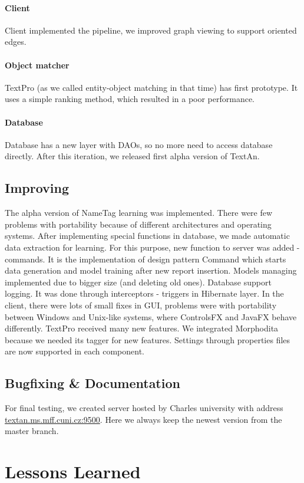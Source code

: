 \paragraph{Client} Client implemented the pipeline, we improved graph viewing to
support oriented edges.

\paragraph{Object matcher} TextPro (as we called entity-object matching in that
time) has first prototype. It uses a simple ranking method, which resulted in a
poor performance. 

\paragraph{Database} Database has a new layer with DAOs, so no more need to
access database directly. After this iteration, we released first alpha version
of TextAn.

\subsection{Improving}
The alpha version of NameTag learning was implemented. There were few problems
with portability because of different architectures and operating systems. After
implementing special functions in database, we made automatic data extraction
for learning. For this purpose, new function to server was added - commands. It
is the implementation of design pattern Command which starts data generation and
model training after new report insertion. Models managing implemented due to
bigger size (and deleting old ones). Database support logging. It was done
through interceptors - triggers in Hibernate layer. In the client, there were
lots of small fixes in GUI, problems were with portability between Windows and
Unix-like systems, where ControlsFX and JavaFX behave differently. TextPro
received many new features. We integrated Morphodita because we needed its
tagger for new features. Settings through properties files are now supported in
each component.

\subsection{Bugfixing \& Documentation}
For final testing, we created server hosted by Charles university with address
\url{textan.ms.mff.cuni.cz:9500}. Here we always keep the newest version from
the master branch.

\section{Lessons Learned}

